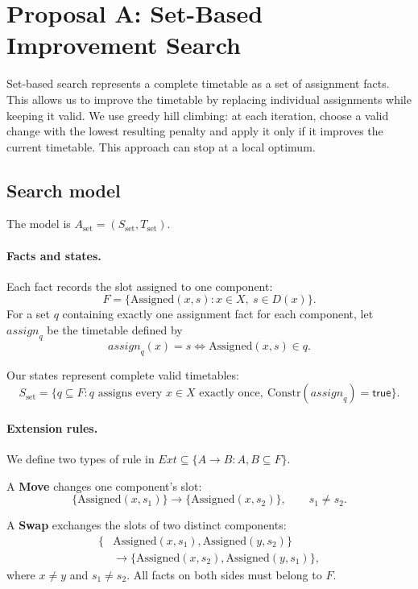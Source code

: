 
\section{Proposal A: Set-Based Improvement Search}
\label{sec:set}

Set-based search represents a complete timetable as a set
of assignment facts. This allows us to improve the timetable
by replacing individual assignments while keeping it valid.
We use greedy hill climbing: at each iteration, choose a
valid change with the lowest resulting penalty and apply
it only if it improves the current timetable. This approach
can stop at a local optimum.

\subsection{Search model}
\label{sec:set-model}

The model is $A_{\mathrm{set}}=(S_{\mathrm{set}},
T_{\mathrm{set}})$.

\paragraph{Facts and states.}
Each fact records the slot assigned to one component:
\[
F=\{\mathrm{Assigned}(x,s):x\in X,\ s\in D(x)\}.
\]
For a set $q$ containing exactly one assignment fact for
each component, let $\mathit{assign}_q$ be the timetable
defined by
\[
\mathit{assign}_q(x)=s
\iff \mathrm{Assigned}(x,s)\in q.
\]

Our states represent complete valid timetables:
\[
S_{\mathrm{set}}
=\{q\subseteq F:
  q\text{ assigns every }x\in X\text{ exactly once},
  \ \mathrm{Constr}(\mathit{assign}_q)=\mathsf{true}\}.
\]

\paragraph{Extension rules.}
We define two types of rule in
$\mathit{Ext}\subseteq\{A\to B:A,B\subseteq F\}$.

A \textbf{Move} changes one component's slot:
\[
\{\mathrm{Assigned}(x,s_1)\}
\longrightarrow
\{\mathrm{Assigned}(x,s_2)\},
\qquad s_1\neq s_2.
\]

A \textbf{Swap} exchanges the slots of two distinct
components:
\[
\begin{aligned}
\{&\mathrm{Assigned}(x,s_1),
   \mathrm{Assigned}(y,s_2)\}\\
&\longrightarrow
\{\mathrm{Assigned}(x,s_2),
  \mathrm{Assigned}(y,s_1)\},
\end{aligned}
\]
where $x\neq y$ and $s_1\neq s_2$.
All facts on both sides must belong to $F$.

